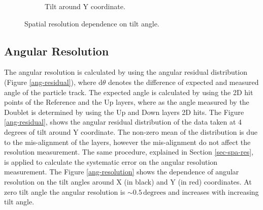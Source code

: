 \documentclass[a4paper,11pt]{article}
\newcommand{\myunit}[1]{$\, \mathrm{#1}$}
\begin{document}
\begin{figure}[h!]
\begin{subfigure}[t]{0.45\textwidth}
	\caption{Tilt around Y coordinate.}
                \label{res-Y}
        \end{subfigure}
         \caption{Spatial resolution dependence on tilt angle.}
        \label{res}
\end{figure}


\subsection{Angular Resolution}
The angular resolution is calculated by using the angular residual distribution (Figure \ref{ang-residual}), where d$\theta$ denotes the difference of expected and measured angle of the particle track. The expected angle is calculated by using the 2D hit points of the Reference and the Up layers, where as the angle measured by the Doublet is determined by using the Up and Down layers 2D hits. The Figure \ref{ang-residual}, shows the angular residual distribution of the data taken at 4 degrees of tilt around Y coordinate. The non-zero mean of the distribution is due to the mis-alignment of the layers, however the mis-alignment do not affect the resolution measurement. The same procedure, explained in Section \ref{sec-spa-res}, is applied to calculate the systematic error on the angular resolution measurement. The Figure \ref{ang-resolution} shows the dependence of angular resolution on the tilt angles around X (in black) and Y (in red) coordinates. At zero tilt angle the angular resolution is $\sim 0.5$\myunit{degrees} and increases with increasing tilt angle. 
\end{document}
